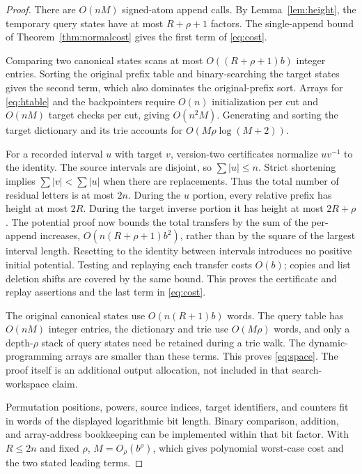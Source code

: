 \documentclass[11pt,a4paper]{article}
\theoremstyle{definition}\newtheorem{definition}[theorem]{Definition}
\theoremstyle{remark}\newtheorem{remark}[theorem]{Remark}
\begin{document}
\begin{proof}
There are $O(nM)$ signed-atom append calls. By
Lemma~\ref{lem:height}, the temporary query states have at most
$R+\rho+1$ factors. The single-append bound of
Theorem~\ref{thm:normalcost} gives the first term of \eqref{eq:cost}.

Comparing two canonical states scans at most $O((R+\rho+1)b)$ integer
entries. Sorting the original prefix table and binary-searching the target
states gives the second term, which also dominates the original-prefix
sort. Arrays for \eqref{eq:htable} and the backpointers require $O(n)$
initialization per cut and $O(nM)$ target checks per cut, giving $O(n^2M)$.
Generating and sorting the target dictionary and its trie accounts for
$O(M\rho\log(M+2))$.

For a recorded interval $u$ with target $v$, version-two certificates
normalize $uv^{-1}$ to the identity. The source intervals are disjoint, so
$\sum |u|\le n$. Strict shortening implies $\sum |v|<\sum |u|$ when
there are replacements. Thus the total number of residual letters is at
most $2n$. During the $u$ portion, every relative prefix has height at most
$2R$. During the target inverse portion it has height at most $2R+\rho$.
The potential proof now bounds the total transfers by the sum of the
per-append increases, $O(n(R+\rho+1)b^2)$, rather than by the square of the
largest interval length. Resetting to the identity between intervals
introduces no positive initial potential. Testing and replaying each
transfer costs $O(b)$; copies and list deletion shifts are covered by the
same bound. This proves the certificate and replay assertions and the last
term in \eqref{eq:cost}.

The original canonical states use $O(n(R+1)b)$ words. The query table has
$O(nM)$ integer entries, the dictionary and trie use $O(M\rho)$ words, and
only a depth-$\rho$ stack of query states need be retained during a trie
walk. The dynamic-programming arrays are smaller than these terms. This
proves \eqref{eq:space}. The proof itself is an additional output allocation,
not included in that search-workspace claim.

Permutation positions, powers, source indices, target identifiers, and
counters fit in words of the displayed logarithmic bit length. Binary
comparison, addition, and array-address bookkeeping can be implemented
within that bit factor. With $R\le2n$ and fixed $\rho$, $M=O_\rho(b^\rho)$,
which gives polynomial worst-case cost and the two stated leading terms.
\end{proof}
\end{document}
